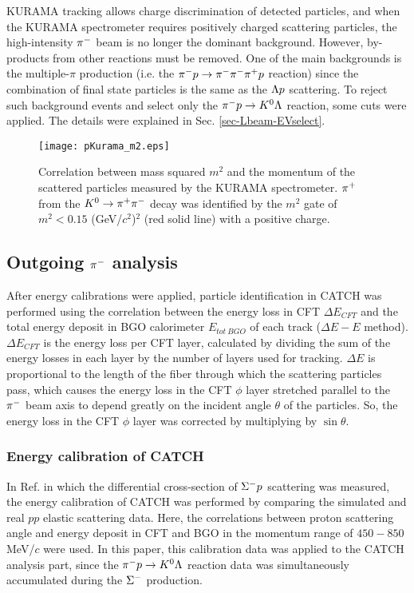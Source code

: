 KURAMA tracking allows charge discrimination of detected particles, and when the KURAMA spectrometer requires positively charged scattering particles, the high-intensity $\pi^{-}$ beam is no longer the dominant background. However, by-products from other reactions must be removed. One of the main backgrounds is the multiple-$\pi$ production (i.e. the $\pi^- p \to \pi^-\pi^-\pi^+p$ reaction) since the combination of final state particles is the same as the $\Lambda p$ scattering. To reject such background events and select only the $\pi^- p \to K^0 \Lambda$ reaction, some cuts were applied. The details were explained in Sec. \ref{sec-Lbeam-EVselect}. 

\begin{figure}[!h]
  \begin{center}
    \texttt{[image: pKurama\_m2.eps]}
    \caption{Correlation between mass squared $m^{2}$ and the momentum of the scattered particles measured by the KURAMA spectrometer. $\pi^{+}$ from the $K^0 \to \pi^+ \pi^-$ decay was identified by the $m^{2}$ gate of $m^{2}<0.15$ (GeV/$c^{2}$)$^{2}$ (red solid line) with a positive charge.}
    \label{fig-pKurama_m2}
  \end{center}
\end{figure}



\subsection{Outgoing $\pi^{-}$ analysis}
After energy calibrations \cite{Miwa-SMp} were applied, particle identification in CATCH was performed using the correlation between the energy loss in CFT $\Delta E_{CFT}$ and the total energy deposit in BGO calorimeter $E_{tot\ BGO}$ of each track ($\Delta E-E$ method). $\Delta E_{CFT}$ is the energy loss per CFT layer, calculated by dividing the sum of the energy losses in each layer by the number of layers used for tracking. $\Delta E$ is proportional to the length of the fiber through which the scattering particles pass, which causes the energy loss in the CFT $\phi$ layer stretched parallel to the $\pi^{-}$ beam axis to depend greatly on the incident angle $\theta$ of the particles. So, the energy loss in the CFT $\phi$ layer was corrected by multiplying by $\sin\theta$. 

\subsubsection{Energy calibration of CATCH}
In Ref. \cite{Miwa-SMp} in which the differential cross-section of $\Sigma^{-}p$ scattering was measured, the energy calibration of CATCH was performed by comparing the simulated and real $pp$ elastic scattering data. Here, the correlations between proton scattering angle and energy deposit in CFT and BGO in the momentum range of $450-850$ MeV/$c$ were used. In this paper, this calibration data was applied to the CATCH analysis part, since the $\pi^- p \to K^0 \Lambda$ reaction data was simultaneously accumulated during the $\Sigma^{-}$ production.

